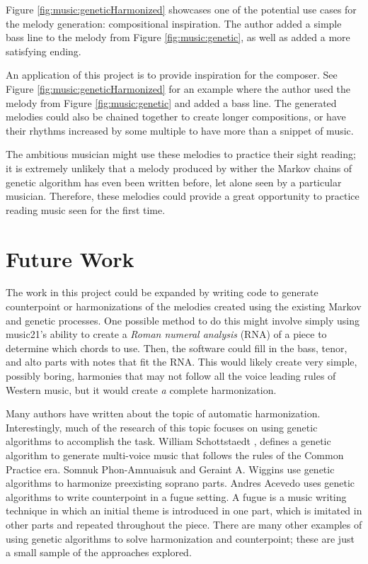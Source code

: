 Figure \ref{fig:music:geneticHarmonized} showcases one of the potential use cases for the melody generation: compositional inspiration.
The author added a simple bass line to the melody from Figure \ref{fig:music:genetic}, as well as added a more satisfying ending.

An application of this project is to provide inspiration for the composer.
See Figure \ref{fig:music:geneticHarmonized} for an example where the author used the melody from Figure \ref{fig:music:genetic} and added a bass line.
The generated melodies could also be chained together to create longer compositions, or have their rhythms increased by some multiple to have more than a snippet of music.

The ambitious musician might use these melodies to practice their sight reading; it is extremely unlikely that a melody produced by wither the Markov chains of genetic algorithm has even been written before, let alone seen by a particular musician.
Therefore, these melodies could provide a great opportunity to practice reading music seen for the first time.

\section{Future Work} \label{future}

The work in this project could be expanded by writing code to generate counterpoint or harmonizations of the melodies created using the existing Markov and genetic processes.
One possible method to do this might involve simply using music21's ability to create a \textit{Roman numeral analysis} (RNA) of a piece to determine which chords to use.
Then, the software could fill in the bass, tenor, and alto parts with notes that fit the RNA.
This would likely create very simple, possibly boring, harmonies that may not follow all the voice leading rules of Western music, but it would create \textit{a} complete harmonization.

Many authors have written about the topic of automatic harmonization.
Interestingly, much of the research of this topic focuses on using genetic algorithms to accomplish the task.
William Schottstaedt \cite{schottstdaet_automatic_1989}, defines a genetic algorithm to generate multi-voice music that follows the rules of the Common Practice era.
Somnuk Phon-Amnuaisuk and Geraint A. Wiggins \cite{phon-amnuaisuk_four-part_1999} use genetic algorithms to harmonize preexisting soprano parts.
Andres Acevedo \cite{acevedo_fugue_2004} uses genetic algorithms to write counterpoint in a fugue setting.
A fugue is a music writing technique in which an initial theme is introduced in one part, which is imitated in other parts and repeated throughout the piece.
There are many other examples of using genetic algorithms to solve harmonization and counterpoint; these are just a small sample of the approaches explored.

